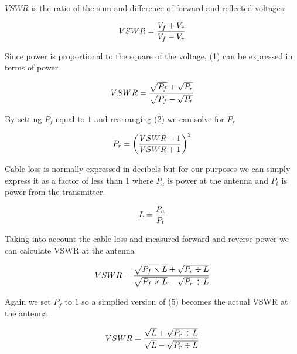 	$VSWR$ is the ratio of the sum and difference of forward and reflected voltages:

	\begin{equation}
		VSWR = {{V_f+V_r}\over{V_f-V_r}}
	\end{equation}

	Since power is proportional to the square of the voltage, (1) can be expressed in terms of power

	\begin{equation}
		VSWR = {{\sqrt{P_f}+\sqrt{P_r}}\over{\sqrt{P_f}-\sqrt{P_r}}}
	\end{equation}

	By setting $P_f$ equal to $1$ and rearranging (2) we can solve for  $P_r$

	\begin{equation}
		P_r = \left({{VSWR-1}\over{VSWR+1}}\right)^{2}
	\end{equation}

	Cable loss is normally expressed in decibels but for our purposes we can simply express it as a factor of less than 1 where $P_a$ is power
	at the antenna and $P_t$ is power from the transmitter.

	\begin{equation}
		L = {{P_a }\over{ P_t}}
	\end{equation}

	Taking into account the cable loss and measured forward and reverse power we can calculate VSWR at the antenna

	\begin{equation}
		VSWR = {{\sqrt{P_f \times L}+\sqrt{P_r \div L}}\over{\sqrt{P_f \times L}-\sqrt{P_r \div L}}}
	\end{equation}

	Again we set $P_f$ to $1$ so a simplied version of (5) becomes the actual VSWR at the antenna

	\begin{equation}
		VSWR = {{\sqrt{L}+\sqrt{P_r \div L}}\over{\sqrt{L}-\sqrt{P_r \div L}}}
	\end{equation}





